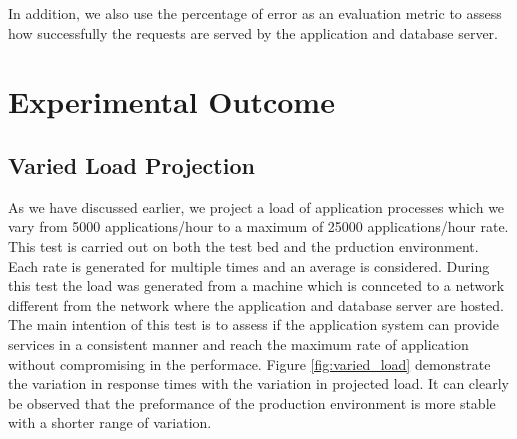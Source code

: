 \documentclass[sigconf,authordraft]{acmart}
\begin{document}
In addition, we also use the percentage of error as an evaluation metric to assess how successfully the requests are served by the application and database server. 




\section{Experimental Outcome}
\subsection{Varied Load Projection}
As we have discussed earlier, we project a load of application processes which we vary from 5000 applications/hour to a maximum of 25000 applications/hour rate. This test is carried out on both the test bed and the prduction environment. 
Each rate is generated for multiple times and an average is considered. During this test the load was generated from a machine which is connceted to a network different from the network where the application and database server are hosted.  
The main intention of this test is to assess if the application system can provide services in a consistent manner and reach the maximum rate of application without compromising in the performace. Figure \ref{fig:varied_load} demonstrate the variation in response times with the variation in projected load. It can clearly be observed that the preformance of the production environment is more stable with a shorter range of variation. 
\end{document}
